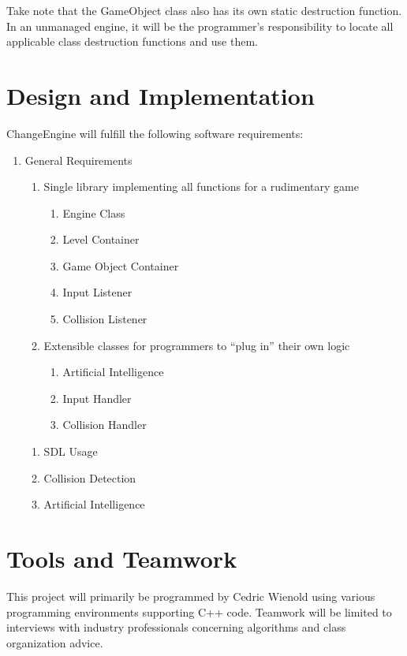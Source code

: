 \documentclass[12pt]{article}
\begin{document}
Take note that the GameObject class also has its own static destruction function. In an unmanaged engine, it will be the programmer's responsibility to locate all applicable class destruction functions and use them.

  \section{Design and Implementation}
    ChangeEngine will fulfill the following software requirements:

\begin{enumerate}
  \item General Requirements

  \begin{enumerate}
    \item Single library implementing all functions for a rudimentary game

    \begin{enumerate}
      \item Engine Class
      \item Level Container
      \item Game Object Container
      \item Input Listener
      \item Collision Listener
    \end{enumerate}

    \item Extensible classes for programmers to ``plug in'' their own logic

    \begin{enumerate}
      \item Artificial Intelligence
      \item Input Handler
      \item Collision Handler
    \end{enumerate}

  \end{enumerate}

  \begin{enumerate}
    \item SDL Usage
    \item Collision Detection
    \item Artificial Intelligence
  \end{enumerate}

\end{enumerate}



  \section{Tools and Teamwork}
    This project will primarily be programmed by Cedric Wienold using various programming environments supporting C++ code. Teamwork will be limited to interviews with industry professionals concerning algorithms and class organization advice.
\end{document}
